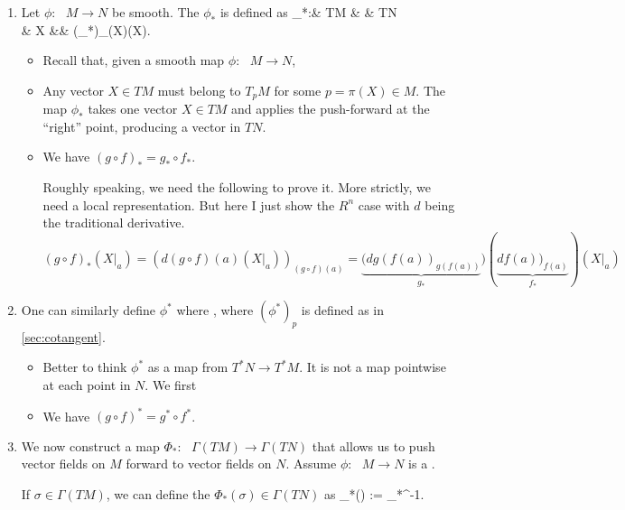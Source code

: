 \documentclass{article}
\newcommand{\cl}{:\text{ }}
\begin{document}
\begin{enumerate}
\item {}
Let $\phi\cl M \to N$ be smooth. The  $\phi_*$ is defined as
\phi_*\cl & TM & \to & TN\\
& X &\mapsto & (\phi_*)_{\pi(X)}(X).
\ei
\begin{itemize}
\item Recall that, given a smooth map $\phi\cl M \to N$,  
    \item Any vector $X\in TM$ must belong to $T_pM$ for some $p=\pi(X)\in M$. The map $\phi_*$ takes one vector $X\in TM$ and applies the push-forward at the ``right'' point, producing a vector in $TN$.
   \item {} We have  $(g \circ f)_*=g_* \circ f_*$.
   
{\tiny Roughly speaking, we need the following  to prove it. More strictly, we need a local representation. But here I just show the $R^n$ case with $d$ being the traditional derivative.
$$(g\circ f)_*(X|_a)=(d (g\circ f)(a)(X|_a))_{(g\circ f)(a)}=\underbrace{(d g(f(a))_{g(f(a))}}_{g_*}) ( \underbrace{d f(a))_{f(a)}}_{f_*} )(X|_a)
$$}
\end{itemize}

\item {} One can similarly define  $\phi^*$ where , where $(\phi^*)_p$ is defined as in \cref{sec:cotangent}. 
\begin{itemize}
    \item Better  to think $\phi^*$ as a map from $T^*N \to T^*M$. It is not a map pointwise at each point in $N$. We first  
    \item {} We have  $(g \circ f)^*=g^* \circ f^*$.
\end{itemize}

\item {} We now construct a map $\Phi_*\cl\Gamma(TM)\to\Gamma(TN)$ that allows us to push vector fields on $M$ forward to vector fields on $N$.  Assume $\phi\cl M \to N$ is a .
\bse
{}
\ese
If $\sigma \in \Gamma(TM)$, we can define the  $\Phi_*(\sigma)\in \Gamma(TN)$ as
\bse
\Phi_*(\sigma) := \phi_*\circ\sigma\circ\phi^{-1}.
\ese


\end{enumerate}
\end{document}
